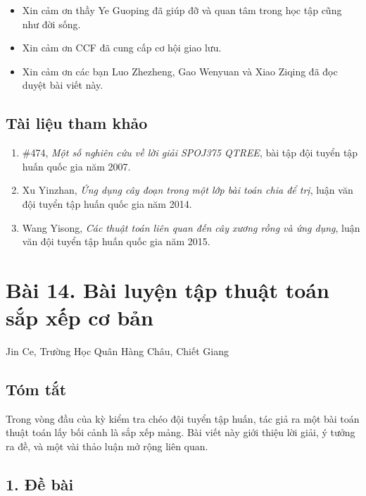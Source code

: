 \documentclass[11pt]{article}
\begin{document}
\begin{itemize}
  \item Xin cảm ơn thầy Ye Guoping đã giúp đỡ và quan tâm trong học tập cũng
  như đời sống.
  \item Xin cảm ơn CCF đã cung cấp cơ hội giao lưu.
  \item Xin cảm ơn các bạn Luo Zhezheng, Gao Wenyuan và Xiao Ziqing đã đọc
  duyệt bài viết này.
\end{itemize}

\subsection*{Tài liệu tham khảo}

\begin{enumerate}
  \item \#474, \emph{Một số nghiên cứu về lời giải SPOJ375 QTREE}, bài tập
  đội tuyển tập huấn quốc gia năm 2007.
  \item Xu Yinzhan, \emph{Ứng dụng cây đoạn trong một lớp bài toán chia để
  trị}, luận văn đội tuyển tập huấn quốc gia năm 2014.
  \item Wang Yisong, \emph{Các thuật toán liên quan đến cây xương rồng và ứng
  dụng}, luận văn đội tuyển tập huấn quốc gia năm 2015.
\end{enumerate}

\section*{Bài 14. Bài luyện tập thuật toán sắp xếp cơ bản}

\begin{center}
Jin Ce, Trường Học Quân Hàng Châu, Chiết Giang
\end{center}

\subsection*{Tóm tắt}

Trong vòng đầu của kỳ kiểm tra chéo đội tuyển tập huấn, tác giả ra một bài
toán thuật toán lấy bối cảnh là sắp xếp mảng. Bài viết này giới thiệu lời
giải, ý tưởng ra đề, và một vài thảo luận mở rộng liên quan.

\subsection*{1. Đề bài}
\end{document}

